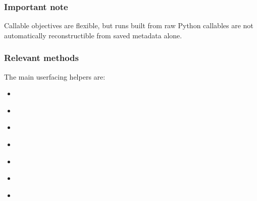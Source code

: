 \documentclass[letterpaper,10pt,english,openany,oneside]{sphinxmanual}
\begin{document}
\subsubsection{Important note}
\label{\detokenize{api/package/objective:important-note}}
\sphinxAtStartPar
Callable objectives are flexible, but runs built from raw Python callables are not automatically reconstructible from saved metadata alone.


\subsubsection{Relevant methods}
\label{\detokenize{api/package/objective:relevant-methods}}
\sphinxAtStartPar
The main user\sphinxhyphen{}facing helpers are:
\begin{itemize}
\item {} 
\sphinxAtStartPar
{\hyperref[\detokenize{api/package/object:nlpoptnet.api.NLPOptNet.objective}]{}}

\item {} 
\sphinxAtStartPar
{\hyperref[\detokenize{api/package/object:nlpoptnet.api.NLPOptNet.lin}]{}}

\item {} 
\sphinxAtStartPar
{\hyperref[\detokenize{api/package/object:nlpoptnet.api.NLPOptNet.batch_lin}]{}}

\item {} 
\sphinxAtStartPar
{\hyperref[\detokenize{api/package/object:nlpoptnet.api.NLPOptNet.quad}]{}}

\item {} 
\sphinxAtStartPar
{\hyperref[\detokenize{api/package/object:nlpoptnet.api.NLPOptNet.batch_quad}]{}}

\item {} 
\sphinxAtStartPar
{\hyperref[\detokenize{api/package/object:nlpoptnet.api.NLPOptNet.batch_exp}]{}}

\item {} 
\sphinxAtStartPar
{\hyperref[\detokenize{api/package/object:nlpoptnet.api.NLPOptNet.sin}]{}}


\end{itemize}
\end{document}
